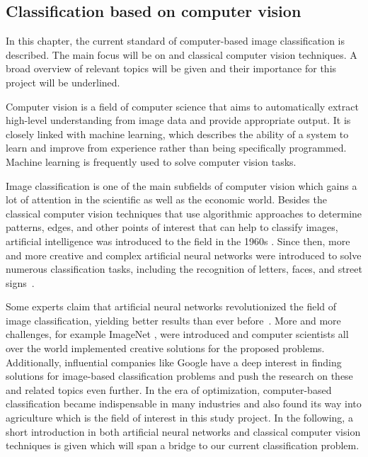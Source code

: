 \subsection{Classification based on computer vision}
\label{sec:BackgroundCV}

In this chapter, the current standard of computer-based image classification is described. The main focus will be on  and classical computer vision techniques. A broad overview of relevant topics will be given and their importance for this project will be underlined.

Computer vision is a field of computer science that aims to automatically extract high-level understanding from image data and provide appropriate output. It is closely linked with machine learning, which describes the ability of a system to learn and improve from experience rather than being specifically programmed. Machine learning is frequently used to solve computer vision tasks.

\bigskip
Image classification is one of the main subfields of computer vision which gains a lot of attention in the scientific as well as the economic world. Besides the classical computer vision techniques that use algorithmic approaches to determine patterns, edges, and other points of interest that can help to classify images, artificial intelligence was introduced to the field in the 1960s \citep{szeliski2010computer}. Since then, more and more creative and complex artificial neural networks were introduced to solve numerous classification tasks, including the recognition of letters, faces, and street signs~\citep{mironczuk2018recent,balaban2015deep,stallkamp2011german}.

Some experts claim that artificial neural networks revolutionized the field of image classification, yielding better results than ever before~\citep{he2016deep,alexnet2012original}. More and more challenges, for example ImageNet \citep{russakovsky2015imagenet}, were introduced and computer scientists all over the world implemented creative solutions for the proposed problems. Additionally, influential companies like Google have a deep interest in finding solutions for image-based classification problems and push the research on these and related topics even further. In the era of optimization, computer-based classification became indispensable in many industries and also found its way into agriculture which is the field of interest in this study project.
In the following, a short introduction in both artificial neural networks and classical computer vision techniques is given which will span a bridge to our current classification problem.

